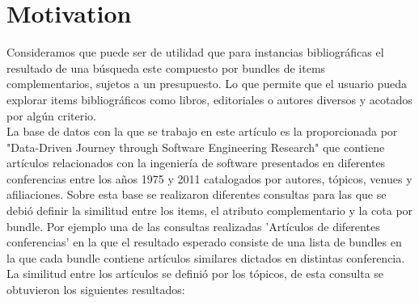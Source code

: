 \section{Motivation}
Consideramos que puede ser de utilidad que para instancias bibliográficas el resultado de una búsqueda este compuesto por bundles de items complementarios, sujetos a un presupuesto. 
Lo que permite que el usuario pueda explorar items bibliográficos como libros, editoriales o autores diversos y acotados por algún criterio.\\
La base de datos con la que se trabajo en este artículo es la proporcionada por "Data-Driven Journey through Software Engineering Research" que contiene artículos relacionados con la ingeniería de software presentados en diferentes conferencias entre los años 1975 y 2011 catalogados por autores, tópicos, venues y afiliaciones. Sobre esta base se realizaron diferentes consultas para las que se debió definir la similitud entre los items, el atributo complementario y la cota por bundle. Por ejemplo una de las consultas realizadas 'Artículos de diferentes conferencias'
en la que el resultado esperado consiste de una lista de bundles en la que cada bundle contiene artículos similares dictados en distintas conferencia. La similitud entre los artículos se definió por los tópicos, de esta consulta se obtuvieron los siguientes resultados: